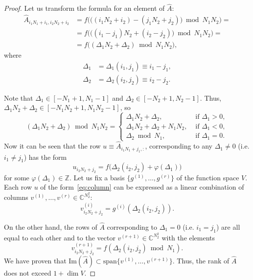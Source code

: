 \documentclass[a4paper]{article}
\begin{document}
	\begin{proof}
	    Let us transform the formula for an element of  $\widehat{A}$:
	    \begin{align*}
			\widehat{A}_{i_1N_1 + i_1, i_2N_2 + i_2} &= 
			f\Big(\big((i_1N_2 + i_2) - (j_1N_2 + j_2)\big) \bmod N_1N_2\Big) = \\ &=
			f\Big(\big((i_1-j_1)N_2 + (i_2 - j_2)\big) \bmod N_1N_2\Big) = \\ &=
			f\big((\Delta_1 N_2 + \Delta_2) \bmod N_1N_2\big),
		\end{align*}
		where
    	\begin{align*}
		\Delta_1 &= \Delta_1(i_1,j_1) \equiv i_1-j_1, \\
		\Delta_2 &= \Delta_2(i_2,j_2) \equiv i_2-j_2.
		\end{align*}
		

		
		Note that $\Delta_1 \in [-N_1+1,N_1-1]$ and $\Delta_2 \in [-N_2+1, N_2 -1]$.
		Thus, $\Delta_1N_2 + \Delta_2  \in [-N_1N_2+1, N_1N_2 - 1]$, so
		\[
		(\Delta_1N_2 + \Delta_2) \bmod N_1N_2 =
		\begin{cases}
		    \Delta_1N_2 + \Delta_2,          & \text{ if } \Delta_1 > 0, \\
		    \Delta_1N_2 + \Delta_2 + N_1N_2, & \text{ if } \Delta_1 < 0, \\
		    \Delta_2 \bmod N_1,         & \text{ if } \Delta_1 = 0.
		\end{cases}
		\] 
		Now it can be seen that the row $u \equiv \widehat{A}_{i_1N_1+j_1,:}$, corresponding to  any $\Delta_1 \neq 0$ (i.e. $i_1 \neq j_1$) has the form
		\begin{equation}\label{eq:column}
		 	u_{i_2N_2+j_2} = 
		 	f\big(\Delta_2(i_2,j_2) + \varphi(\Delta_1)\big)
		\end{equation}
		for some $\varphi(\Delta_1) \in \mathbb{Z}$.
		Let us fix a basis $\{g^{(1)}, \dots, g^{(r)}\}$ of the function space  $V$.
		Each row $u$ of the form~\eqref{eq:column} can be expressed as a linear combination of columns $v^{(1)}, \dots, v^{(r)} \in \mathbb{C}^{N_2^2}$:
		\[
			v^{(i)}_{i_2N_2+j_2} = 
			g^{(i)}(\Delta_2(i_2,j_2)).
		\]
        		
		On the other hand, the rows of $\widehat{A}$ corresponding to $\Delta_1 = 0$ (i.e. $i_1 = j_1$) are all equal to each other and to the vector $v^{(r+1)} \in \mathbb{C}^{N_2^2}$ with the elements
		\[
		v^{(r+1)}_{i_2N_2+j_2} = f(\Delta_2(i_2, j_2) \bmod N_1).
		\]
		We have proven that $\mathrm{Im}(\widehat{A}) \subset \mathrm{span}\{v^{(1)}, \dots, v^{(r+1)}\}$.
		Thus, the rank of $\widehat{A}$ does not exceed $1 + \dim V$.
	\end{proof}
\end{document}
